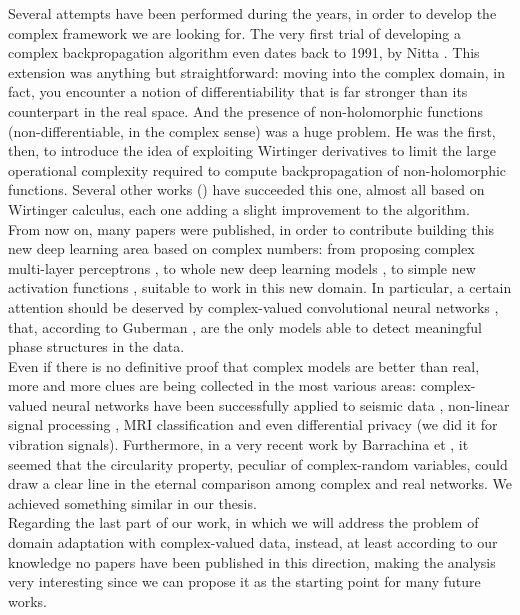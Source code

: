 \documentclass[../main.tex]{subfiles}
\begin{document}
Several attempts have been performed during the years, in order to develop the complex framework we are looking for. The very first trial of developing a complex backpropagation algorithm even dates back to 1991, by Nitta \cite{Nitta_complexBP}. This extension was anything but straightforward: moving into the complex domain, in fact, you encounter a notion of differentiability that is far stronger than its counterpart in the real space. And the presence of non-holomorphic functions (non-differentiable, in the complex sense) was a huge problem. He was the first, then, to introduce the idea of exploiting Wirtinger derivatives to limit the large operational complexity required to compute backpropagation of non-holomorphic functions. Several other works (\cite{kreutzdelgado2009complex, amin_wirtinger, Hualiang_nonlinear}) have succeeded this one, almost all based on Wirtinger calculus, each one adding a slight improvement to the algorithm.\\
From now on, many papers were published, in order to contribute building this new deep learning area based on complex numbers: from proposing complex multi-layer perceptrons \cite{complex_mlp}, to whole new deep learning models \cite{trabelsi2018deep}, to simple new activation functions \cite{scardapane2018complexvalued, virtue2017better}, suitable to work in this new domain. In particular, a certain attention should be deserved by complex-valued convolutional neural networks \cite{hirose_cvnn}, that, according to Guberman \cite{guberman2016complex}, are the only models able to detect meaningful phase structures in the data.\\
Even if there is no definitive proof that complex models are better than real, more and more clues are being collected in the most various areas: complex-valued neural networks have been successfully applied to seismic data \cite{Dramsch_seismic}, non-linear signal processing \cite{complex_mlp}, MRI classification \cite{virtue2017better} and even differential privacy \cite{ziller2021complexvalued} (we did it for vibration signals). Furthermore, in a very recent work by Barrachina et \cite{barrachina2021complexvalued}, it seemed that the circularity property, peculiar of complex-random variables, could draw a clear line in the eternal comparison among complex and real networks. We achieved something similar in our thesis.\\ Regarding the last part of our work, in which we will address the problem of domain adaptation with complex-valued data, instead, at least according to our knowledge no papers have been published in this direction, making the analysis very interesting since we can propose it as the starting point for many future works.
\end{document}
